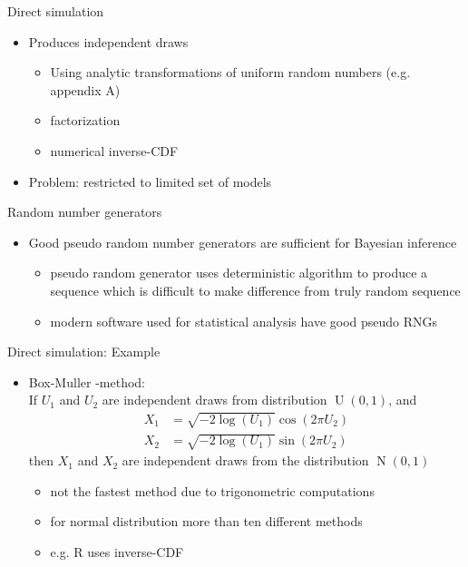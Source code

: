 \documentclass[finnish,english,t]{beamer}
\DeclareMathOperator{\N}{N}
\DeclareMathOperator{\U}{U}
\begin{document}
\begin{frame}{Direct simulation}

  \begin{itemize}
  \item Produces independent draws
    \begin{itemize}
    \item Using analytic transformations of uniform random numbers
      (e.g. appendix A)
    \item factorization
    \item numerical inverse-CDF
    \end{itemize}
  \item Problem: restricted to limited set of models
  \end{itemize}

\end{frame}

\begin{frame}

  {\Large\color{navyblue} Random number generators}

  \begin{itemize}
  \item Good pseudo random number generators are sufficient for
    Bayesian inference
    \begin{itemize}
    \item pseudo random generator uses deterministic algorithm to
      produce a sequence which is difficult to make difference from
      truly random sequence
    \item modern software used for statistical analysis have good
      pseudo RNGs
    \end{itemize}
  \end{itemize}

\end{frame}

\begin{frame}
{Direct simulation: Example}

  \begin{itemize}
  \item Box-Muller -method:\\ If $U_1$ and $U_2$ are independent
    draws from distribution $\U(0,1)$, and
    \begin{align*}
      X_1 & = \sqrt{-2\log(U_1)}\cos(2\pi U_2) \\
      X_2 & = \sqrt{-2\log(U_1)}\sin(2\pi U_2)
    \end{align*}
    then $X_1$ and $X_2$ are independent draws from the distribution
    $\N(0,1)$
    \pause
    \begin{itemize}
      \item not the fastest method due to trigonometric computations
      \item for normal distribution more than ten different methods
      \item e.g. R uses inverse-CDF
    \end{itemize}
  \end{itemize}

\end{frame}
\end{document}
